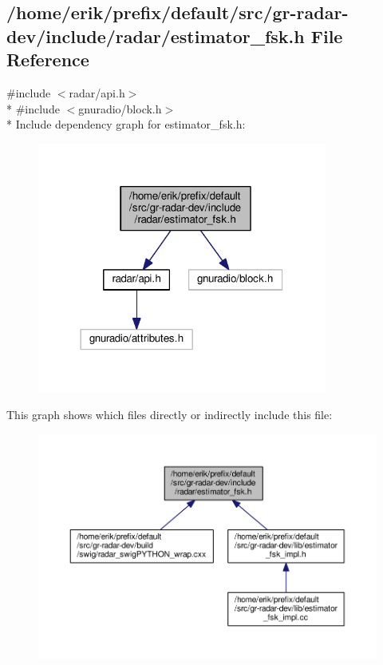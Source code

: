 \subsection{/home/erik/prefix/default/src/gr-\/radar-\/dev/include/radar/estimator\+\_\+fsk.h File Reference}
\label{estimator__fsk_8h}
{\ttfamily \#include $<$radar/api.\+h$>$}\\*
{\ttfamily \#include $<$gnuradio/block.\+h$>$}\\*
Include dependency graph for estimator\+\_\+fsk.\+h\+:
\nopagebreak
\begin{figure}[H]
\begin{center}
\leavevmode
\includegraphics[width=270pt]{dc/db3/estimator__fsk_8h__incl}
\end{center}
\end{figure}
This graph shows which files directly or indirectly include this file\+:
\nopagebreak
\begin{figure}[H]
\begin{center}
\leavevmode
\includegraphics[width=350pt]{d2/d5a/estimator__fsk_8h__dep__incl}
\end{center}
\end{figure}
